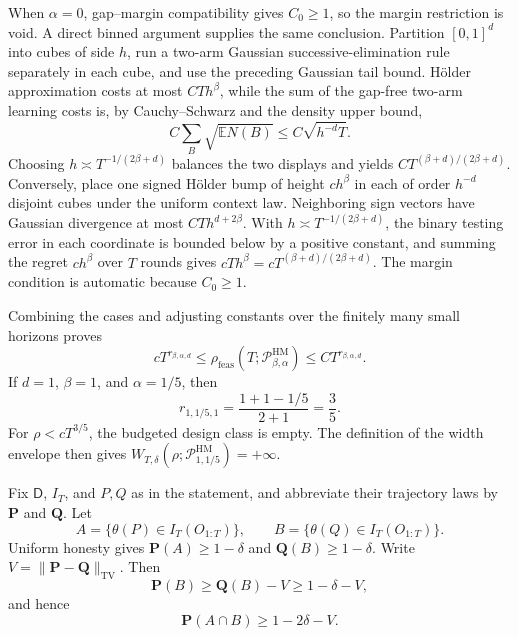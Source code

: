 When \(\alpha=0\), gap--margin compatibility gives \(C_0\geq1\), so the margin restriction is void.  A direct binned argument supplies the same conclusion.  Partition \([0,1]^d\) into cubes of side \(h\), run a two-arm Gaussian successive-elimination rule separately in each cube, and use the preceding Gaussian tail bound.  H\"older approximation costs at most \(CTh^\beta\), while the sum of the gap-free two-arm learning costs is, by Cauchy--Schwarz and the density upper bound,
\[
C\sum_B\sqrt{\mathbb E N(B)}
\leq C\sqrt{h^{-d}T}.
\]
Choosing \(h\asymp T^{-1/(2\beta+d)}\) balances the two displays and yields \(CT^{(\beta+d)/(2\beta+d)}\).  Conversely, place one signed H\"older bump of height \(ch^\beta\) in each of order \(h^{-d}\) disjoint cubes under the uniform context law.  Neighboring sign vectors have Gaussian divergence at most \(CT h^{d+2\beta}\).  With \(h\asymp T^{-1/(2\beta+d)}\), the binary testing error in each coordinate is bounded below by a positive constant, and summing the regret \(ch^\beta\) over \(T\) rounds gives \(cTh^\beta=cT^{(\beta+d)/(2\beta+d)}\).  The margin condition is automatic because \(C_0\geq1\).

Combining the cases and adjusting constants over the finitely many small horizons proves
\[
cT^{r_{\beta,\alpha,d}}
\leq\rho_{\mathrm{feas}}(T;\mathcal P_{\beta,\alpha}^{\mathrm{HM}})
\leq CT^{r_{\beta,\alpha,d}}.
\]
If \(d=1\), \(\beta=1\), and \(\alpha=1/5\), then
\[
r_{1,1/5,1}=\frac{1+1-1/5}{2+1}=\frac35.
\]
For \(\rho<cT^{3/5}\), the budgeted design class is empty.  The definition of the width envelope then gives \(W_{T,\delta}(\rho;\mathcal P_{1,1/5}^{\mathrm{HM}})=+\infty\).

Fix \(\mathsf D\), \(I_T\), and \(P,Q\) as in the statement, and abbreviate their trajectory laws by \(\mathbf P\) and \(\mathbf Q\).  Let
\[
A=\{\theta(P)\in I_T(O_{1:T})\},
\qquad
B=\{\theta(Q)\in I_T(O_{1:T})\}.
\]
Uniform honesty gives \(\mathbf P(A)\geq1-\delta\) and \(\mathbf Q(B)\geq1-\delta\).  Write \(V=\|\mathbf P-\mathbf Q\|_{\mathrm{TV}}\).  Then
\[
\mathbf P(B)\geq\mathbf Q(B)-V\geq1-\delta-V,
\]
and hence
\[
\mathbf P(A\cap B)\geq1-2\delta-V.
\]

